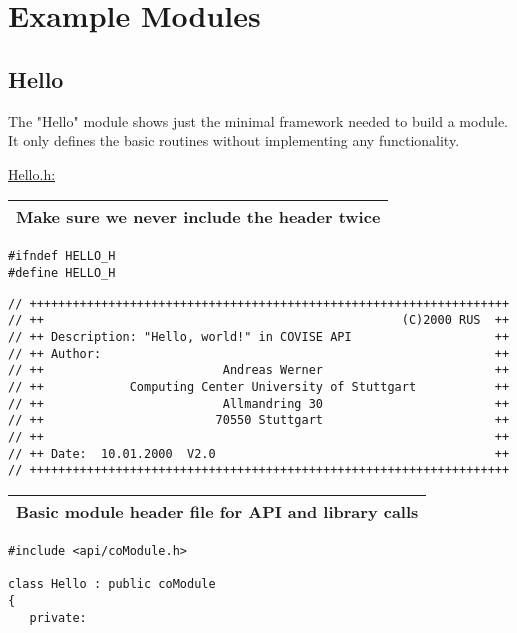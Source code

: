 \startdocument
\chapter{Example Modules}
\label{ExampleModules}


\section{Hello}

The "Hello" module shows just the minimal framework needed to build a module. 
It only defines the basic routines without implementing any functionality.

\underline{Hello.h:}

\begin{longtable}{|l|}
\hline
   {\bf Make sure we never include the header twice} \\
\hline
\end{longtable}

\begin{verbatim}
#ifndef HELLO_H
#define HELLO_H
\end{verbatim}

\begin{verbatim}
// +++++++++++++++++++++++++++++++++++++++++++++++++++++++++++++++++++
// ++                                                  (C)2000 RUS  ++
// ++ Description: "Hello, world!" in COVISE API                    ++
// ++ Author:                                                       ++
// ++                         Andreas Werner                        ++
// ++            Computing Center University of Stuttgart           ++
// ++                         Allmandring 30                        ++
// ++                        70550 Stuttgart                        ++
// ++                                                               ++
// ++ Date:  10.01.2000  V2.0                                       ++
// +++++++++++++++++++++++++++++++++++++++++++++++++++++++++++++++++++
\end{verbatim}

\begin{longtable}{|l|}
\hline
   {\bf Basic module header file for API and library calls} \\
\hline
\end{longtable}

\begin{verbatim} 
#include <api/coModule.h>

class Hello : public coModule
{
   private:
\end{verbatim}

